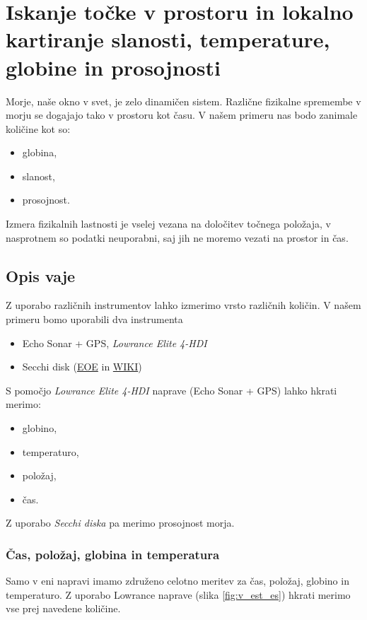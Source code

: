%
\chapter{Iskanje točke v prostoru in lokalno kartiranje slanosti, temperature, globine in prosojnosti}
\label{Vaj:KartSlanGlob} 

Morje, naše okno v svet, je zelo dinamičen sistem. Različne fizikalne spremembe v morju se dogajajo tako v prostoru kot času. V našem primeru nas bodo zanimale količine kot so:
\begin{itemize}
	\item globina,
	\item slanost,
	\item prosojnost.
\end{itemize}

\noindent
Izmera fizikalnih lastnosti je vselej vezana na določitev točnega položaja, v nasprotnem so podatki neuporabni, saj jih ne moremo vezati na prostor in čas. 

\section{Opis vaje}
Z uporabo različnih instrumentov lahko izmerimo vrsto različnih količin. V našem primeru bomo uporabili dva instrumenta
\begin{itemize}
	\item Echo Sonar + GPS, \emph{Lowrance Elite 4-HDI}
	\item Secchi disk (\href{http://www.eoearth.org/view/article/155956/}{EOE} in \href{https://en.wikipedia.org/wiki/Secchi_disk}{WIKI})
\end{itemize}

\noindent
S pomočjo \emph{Lowrance Elite 4-HDI} naprave (Echo Sonar + GPS) lahko hkrati merimo:
\begin{itemize}
	\item globino,
	\item temperaturo,
	\item položaj,
	\item čas.
\end{itemize}

\noindent
Z uporabo \emph{Secchi diska} pa merimo prosojnost morja.

\subsection{Čas, položaj, globina in temperatura}
Samo v eni napravi imamo združeno celotno meritev za čas, položaj, globino in temperaturo. Z uporabo Lowrance naprave (slika \ref{fig:v_est_es}) hkrati merimo vse prej navedene količine.

